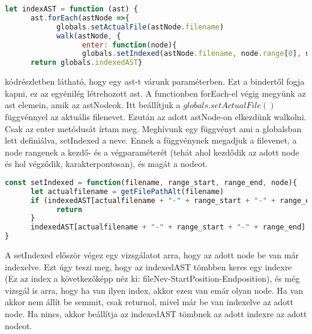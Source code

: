 \begin{lstlisting}[caption={indexAST function}, label={lst:indexAST_function}, language={JavaScript}]
let indexAST = function (ast) {
      ast.forEach(astNode =>{
            globals.setActualFile(astNode.filename)
            walk(astNode, {
                  enter: function(node){
                  globals.setIndexed(astNode.filename, node.range[0], node.range[1], node)}})})
      return globals.indexedAST}
\end{lstlisting}

 kódrészletben látható, hogy egy ast-t várunk paraméterben. Ezt a bindertől fogja kapni, ez az egyénilég létrehozott ast.
A functionben forEach-el végig megyünk az ast elemein, amik az astNodeok. Itt beállítjuk a ${globals.setActualFile()}$ függvénnyel az aktuális filenevet.
Ezután az adott astNode-on elkezdünk walkolni. Csak az enter metódusát írtam meg. Meghívunk egy függvényt ami a globalsban lett definiálva, setIndexed a neve.
Ennek a függvénynek megadjuk a filevenet, a node rangenek a kezdő- és a végparaméterét (tehát ahol kezdődik az adott node és hol végződik, karakterpontosan), és magát a nodeot.

\begin{lstlisting}[caption={setIndexed function}, label={lst:setIndexed_function}, language={JavaScript}]
const setIndexed = function(filename, range_start, range_end, node){
      let actualfilename = getFilePathAlt(filename)
      if (indexedAST[actualfilename + "-" + range_start + "-" + range_end] !== undefined && indexedAST[actualfilename + "-" + range_start + "-" + range_end] !== node){
            return
      }
      indexedAST[actualfilename + "-" + range_start + "-" + range_end] = node
}
\end{lstlisting}

A setIndexed először végez egy vizsgálatot arra, hogy az adott node be van már indexelve.
Ezt úgy teszi meg, hogy az indexedAST tömbben keres egy indexre (Ez az index a következőképp néz ki: fileNev-StartPosition-Endposition), és még vizsgál is arra, hogy ha van ilyen index, akkor ezen van emár olyan node.
Ha van akkor nem állít be semmit, csak returnol, mivel már be van indexelve az adott node. Ha nincs, akkor beállítja az indexedAST tömbnek az adott indexre az adott nodeot.

\noindent

